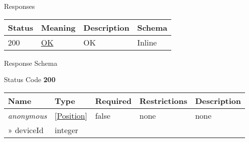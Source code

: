 \documentclass[
]{article}
\begin{document}
Responses

\begin{longtable}[]{@{}llll@{}}
\toprule
Status & Meaning & Description & Schema\tabularnewline
\midrule
\endhead
200 & \href{https://tools.ietf.org/html/rfc7231\#section-6.3.1}{OK} & OK
& Inline\tabularnewline
\bottomrule
\end{longtable}

Response Schema

Status Code \textbf{200}

\begin{longtable}[]{@{}lllll@{}}
\toprule
\begin{minipage}[b]{0.17\columnwidth}\raggedright
Name\strut
\end{minipage} & \begin{minipage}[b]{0.17\columnwidth}\raggedright
Type\strut
\end{minipage} & \begin{minipage}[b]{0.17\columnwidth}\raggedright
Required\strut
\end{minipage} & \begin{minipage}[b]{0.17\columnwidth}\raggedright
Restrictions\strut
\end{minipage} & \begin{minipage}[b]{0.17\columnwidth}\raggedright
Description\strut
\end{minipage}\tabularnewline
\midrule
\endhead
\begin{minipage}[t]{0.17\columnwidth}\raggedright
\emph{anonymous}\strut
\end{minipage} & \begin{minipage}[t]{0.17\columnwidth}\raggedright
{[}\protect\hyperlink{schemaposition}{Position}{]}\strut
\end{minipage} & \begin{minipage}[t]{0.17\columnwidth}\raggedright
false\strut
\end{minipage} & \begin{minipage}[t]{0.17\columnwidth}\raggedright
none\strut
\end{minipage} & \begin{minipage}[t]{0.17\columnwidth}\raggedright
none\strut
\end{minipage}\tabularnewline
\begin{minipage}[t]{0.17\columnwidth}\raggedright
» deviceId\strut
\end{minipage} & \begin{minipage}[t]{0.17\columnwidth}\raggedright
integer\strut
\end{minipage} & \begin{minipage}[t]{0.17\columnwidth}\raggedright

\end{minipage}
\end{longtable}
\end{document}
